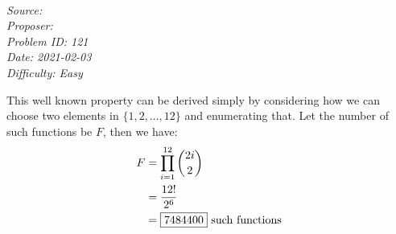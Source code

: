 \SSbreak\\
\emph{Source: \Cfolk}\\
\emph{Proposer: \Pss}\\
\emph{Problem ID: 121}\\
\emph{Date: 2021-02-03}\\
\emph{Difficulty: Easy}\\
\SSbreak

\bigskip

\begin{solution}\hfil\medskip

This well known property can be derived simply by considering how we can choose two elements in \(\{1,2,\ldots,12\}\) and enumerating that. Let the number of such functions be \(F\), then we have:
\begin{align*}
  F&=\prod_{i=1}^{12}\binom{2i}{2}\\
  &=\frac{12!}{2^6}\\
  &=\fbox{7484400}\ \mathrm{such\ functions}
\end{align*}
\end{solution} 